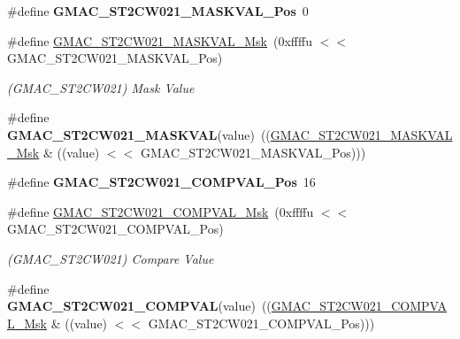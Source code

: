 \begin{DoxyCompactItemize}
\#define {\bfseries G\+M\+A\+C\+\_\+\+S\+T2\+C\+W021\+\_\+\+M\+A\+S\+K\+V\+A\+L\+\_\+\+Pos}~0
\item 
\mbox{\label{group__SAME70__GMAC_gaf65d51f3ea4f88c61837d37e6dd71fa8}} 
\#define \mbox{\hyperlink{group__SAME70__GMAC_gaf65d51f3ea4f88c61837d37e6dd71fa8}{G\+M\+A\+C\+\_\+\+S\+T2\+C\+W021\+\_\+\+M\+A\+S\+K\+V\+A\+L\+\_\+\+Msk}}~(0xffffu $<$$<$ G\+M\+A\+C\+\_\+\+S\+T2\+C\+W021\+\_\+\+M\+A\+S\+K\+V\+A\+L\+\_\+\+Pos)
\begin{DoxyCompactList}\small\item\em (G\+M\+A\+C\+\_\+\+S\+T2\+C\+W021) Mask Value \end{DoxyCompactList}\item 
\mbox{\label{group__SAME70__GMAC_ga1e59dce7fca1e6b504b0148028268a7e}} 
\#define {\bfseries G\+M\+A\+C\+\_\+\+S\+T2\+C\+W021\+\_\+\+M\+A\+S\+K\+V\+AL}(value)~((\mbox{\hyperlink{group__SAMV71__GMAC_gaf65d51f3ea4f88c61837d37e6dd71fa8}{G\+M\+A\+C\+\_\+\+S\+T2\+C\+W021\+\_\+\+M\+A\+S\+K\+V\+A\+L\+\_\+\+Msk}} \& ((value) $<$$<$ G\+M\+A\+C\+\_\+\+S\+T2\+C\+W021\+\_\+\+M\+A\+S\+K\+V\+A\+L\+\_\+\+Pos)))
\item 
\mbox{\label{group__SAME70__GMAC_gaac90ef12fb8c60db6ffa953097f3cc4d}} 
\#define {\bfseries G\+M\+A\+C\+\_\+\+S\+T2\+C\+W021\+\_\+\+C\+O\+M\+P\+V\+A\+L\+\_\+\+Pos}~16
\item 
\mbox{\label{group__SAME70__GMAC_ga0578add027e051a5682100c4af1c111e}} 
\#define \mbox{\hyperlink{group__SAME70__GMAC_ga0578add027e051a5682100c4af1c111e}{G\+M\+A\+C\+\_\+\+S\+T2\+C\+W021\+\_\+\+C\+O\+M\+P\+V\+A\+L\+\_\+\+Msk}}~(0xffffu $<$$<$ G\+M\+A\+C\+\_\+\+S\+T2\+C\+W021\+\_\+\+C\+O\+M\+P\+V\+A\+L\+\_\+\+Pos)
\begin{DoxyCompactList}\small\item\em (G\+M\+A\+C\+\_\+\+S\+T2\+C\+W021) Compare Value \end{DoxyCompactList}\item 
\mbox{\label{group__SAME70__GMAC_gabbd55e75b9b0dc9616e3b7c8148d6bac}} 
\#define {\bfseries G\+M\+A\+C\+\_\+\+S\+T2\+C\+W021\+\_\+\+C\+O\+M\+P\+V\+AL}(value)~((\mbox{\hyperlink{group__SAMV71__GMAC_ga0578add027e051a5682100c4af1c111e}{G\+M\+A\+C\+\_\+\+S\+T2\+C\+W021\+\_\+\+C\+O\+M\+P\+V\+A\+L\+\_\+\+Msk}} \& ((value) $<$$<$ G\+M\+A\+C\+\_\+\+S\+T2\+C\+W021\+\_\+\+C\+O\+M\+P\+V\+A\+L\+\_\+\+Pos)))

\end{DoxyCompactItemize}
